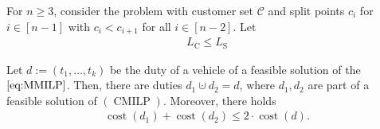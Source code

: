 \begin{theorem}

For $n\geq 3$, consider the problem with customer set $\mathcal{C}$ and split points $c_i$ for $i\in[n-1]$ with $c_i<c_{i+1}$ for all $i\in[n-2]$. Let
\begin{align}
\label{eq:LCLS}
	L_{\operatorname{C}}\leq L_{\operatorname{S}}
\end{align}

Let $d:=\left(t_1,\dots,t_k\right)$ be the duty of a vehicle of a feasible solution of the $\eqref{eq:MMILP}$. Then, there are duties $d_1\cupdot d_2=d$, where $d_1,d_2$ are part of a feasible solution of $(\operatorname{CMILP})$. Moreover, there holds
\begin{align}
	\operatorname{cost}\left(d_1\right)+\operatorname{cost}\left(d_2\right)\leq 2\cdot\operatorname{cost}\left(d\right).
\end{align}

\end{theorem}

